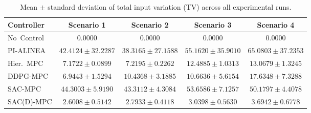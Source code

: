 \begin{table}[htbp]
\centering
\caption{Mean $\pm$ standard deviation of total input variation (TV) across all experimental runs.}
\label{tab:tv_comparison}
\begin{tabular}{lcccc}
\toprule
Controller & Scenario 1 & Scenario 2 & Scenario 3 & Scenario 4 \\
\midrule
No~Control & $0.0000$ & $0.0000$ & $0.0000$ & $0.0000$ \\
PI-ALINEA & $42.4124 \pm 32.2287$ & $38.3165 \pm 27.1588$ & $55.1620 \pm 35.9010$ & $65.0803 \pm 37.2353$ \\
Hier.~MPC & $7.1722 \pm 0.0899$ & $7.2195 \pm 0.2262$ & $12.4885 \pm 1.0313$ & $13.0679 \pm 1.3245$ \\
DDPG-MPC & $6.9443 \pm 1.5294$ & $10.4368 \pm 3.1885$ & $10.6636 \pm 5.6154$ & $17.6348 \pm 7.3288$ \\
SAC-MPC & $44.3003 \pm 5.9190$ & $43.3112 \pm 4.3084$ & $53.6586 \pm 7.1257$ & $50.1797 \pm 4.4078$ \\
SAC(D)-MPC & $2.6008 \pm 0.5142$ & $2.7933 \pm 0.4118$ & $3.0398 \pm 0.5630$ & $3.6942 \pm 0.6778$ \\
\bottomrule
\end{tabular}
\end{table}

